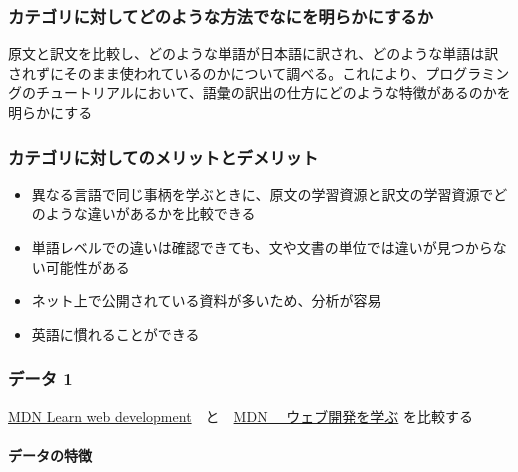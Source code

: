 \hypertarget{ux30abux30c6ux30b4ux30eaux306bux5bfeux3057ux3066ux3069ux306eux3088ux3046ux306aux65b9ux6cd5ux3067ux306aux306bux3092ux660eux3089ux304bux306bux3059ux308bux304b-2}{%
\subsubsection{カテゴリに対してどのような方法でなにを明らかにするか}\label{ux30abux30c6ux30b4ux30eaux306bux5bfeux3057ux3066ux3069ux306eux3088ux3046ux306aux65b9ux6cd5ux3067ux306aux306bux3092ux660eux3089ux304bux306bux3059ux308bux304b-2}}

原文と訳文を比較し、どのような単語が日本語に訳され、どのような単語は訳されずにそのまま使われているのかについて調べる。これにより、プログラミングのチュートリアルにおいて、語彙の訳出の仕方にどのような特徴があるのかを明らかにする

\hypertarget{ux30abux30c6ux30b4ux30eaux306bux5bfeux3057ux3066ux306eux30e1ux30eaux30c3ux30c8ux3068ux30c7ux30e1ux30eaux30c3ux30c8-2}{%
\subsubsection{カテゴリに対してのメリットとデメリット}\label{ux30abux30c6ux30b4ux30eaux306bux5bfeux3057ux3066ux306eux30e1ux30eaux30c3ux30c8ux3068ux30c7ux30e1ux30eaux30c3ux30c8-2}}

\begin{itemize}
\tightlist
\item
  異なる言語で同じ事柄を学ぶときに、原文の学習資源と訳文の学習資源でどのような違いがあるかを比較できる
\item
  単語レベルでの違いは確認できても、文や文書の単位では違いが見つからない可能性がある
\item
  ネット上で公開されている資料が多いため、分析が容易
\item
  英語に慣れることができる
\end{itemize}

\hypertarget{ux30c7ux30fcux30bf-1-2}{%
\subsubsection{データ 1}\label{ux30c7ux30fcux30bf-1-2}}

\href{https://developer.mozilla.org/en-US/docs/Learn}{MDN Learn web
development}　と　\href{https://developer.mozilla.org/ja/docs/Learn/}{MDN
　ウェブ開発を学ぶ} を比較する

\hypertarget{ux30c7ux30fcux30bfux306eux7279ux5fb4-3}{%
\paragraph{データの特徴}\label{ux30c7ux30fcux30bfux306eux7279ux5fb4-3}}

